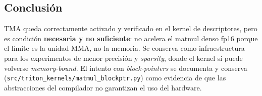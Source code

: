 \subsection{Conclusión}

TMA queda correctamente activado y verificado en el kernel de descriptores, pero es
condición \textbf{necesaria y no suficiente}: no acelera el matmul denso fp16 porque
el límite es la unidad MMA, no la memoria. Se conserva como infraestructura para los
experimentos de menor precisión y \emph{sparsity}, donde el kernel sí puede volverse
\emph{memory-bound}. El intento con \emph{block-pointers} se documenta y conserva
(\texttt{src/triton\_kernels/matmul\_blockptr.py}) como evidencia de que las
abstracciones del compilador no garantizan el uso del hardware.
